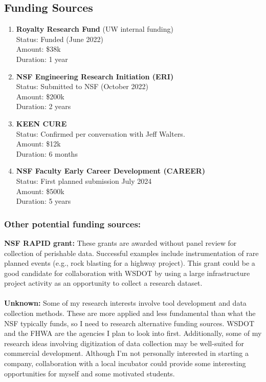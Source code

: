 \documentclass[10pt,letterpaper]{article}
\begin{document}
\subsection*{Funding Sources}
\begin{enumerate}
\item \textbf{Royalty Research Fund} (UW internal funding)\\ 
Status: Funded (June 2022)\\
Amount: \$38k\\
Duration: 1 year
\item \textbf{NSF Engineering Research Initiation (ERI)}\\
Status: Submitted to NSF (October 2022)\\
Amount: \$200k\\
Duration: 2 years
\item \textbf{KEEN CURE}\\
Status: Confirmed per conversation with Jeff Walters.\\
Amount: \$12k\\
Duration: 6 months
\item \textbf{NSF Faculty Early Career Development (CAREER)}\\
Status: First planned submission July 2024\\
Amount: \$500k\\
Duration: 5 years

\end{enumerate}
\subsubsection*{Other potential funding sources:}

\textbf{NSF RAPID grant:} These grants are awarded without panel review for collection of perishable data. Successful examples include instrumentation of rare planned events (e.g., rock blasting for a highway project). 
This grant could be a good candidate for collaboration with WSDOT by using a large infrastructure project activity as an opportunity to collect a research dataset.
\\
\\
\noindent \textbf{Unknown:} Some of my research interests involve tool development and data collection methods.
These are more applied and less fundamental than what the NSF typically funds, so I need to research alternative funding sources. 
WSDOT and the FHWA are the agencies I plan to look into first.
Additionally, some of my research ideas involving digitization of data collection may be well-suited for commercial development. 
Although I'm not personally interested in starting a company, collaboration with a local incubator could provide some interesting opportunities for myself and some motivated students.
\end{document}
